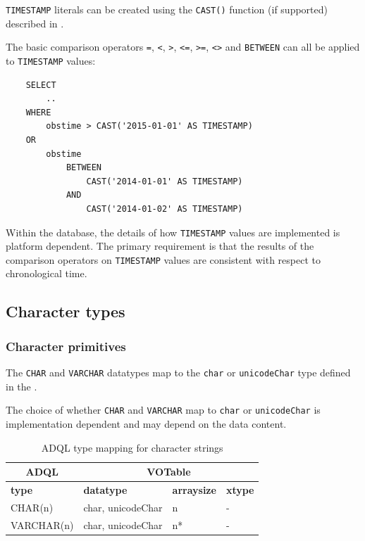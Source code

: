 \documentclass[11pt,a4paper]{ivoa}
\begin{document}
\verb:TIMESTAMP: literals can be created using the \verb:CAST(): function
(if supported) described in .

The basic comparison operators \verb:=:, \verb:<:, \verb:>:, \verb:<=:, \verb:>=:,
\verb:<>: and \verb:BETWEEN: can all be applied to \verb:TIMESTAMP: values:
\begin{verbatim}
    SELECT
        ..
    WHERE
        obstime > CAST('2015-01-01' AS TIMESTAMP)
    OR
        obstime
            BETWEEN
                CAST('2014-01-01' AS TIMESTAMP)
            AND
                CAST('2014-01-02' AS TIMESTAMP)
\end{verbatim}

Within the database, the details of how \verb:TIMESTAMP: values are implemented
is platform dependent. The primary requirement is that the results of the
comparison operators on \verb:TIMESTAMP: values are consistent with respect to
chronological time.

\subsection{Character types}
\label{sec:types.character}

\subsubsection{Character primitives}
\label{sec:types.character.primitive}

The \verb:CHAR: and \verb:VARCHAR: datatypes map to the \verb:char: or
\verb:unicodeChar: type defined in the \VOTableSpec{}.

The choice of whether \verb:CHAR: and \verb:VARCHAR: map to \verb:char: or
\verb:unicodeChar: is implementation dependent and may depend on the data
content.

\begin{table}[th]\footnotesize
    \begin{tabular}
        {|p{}|p{}|p{}|p{}|}
        
        \hline
        \multicolumn{1}{|c|}{\textbf{ADQL}} &
        \multicolumn{3}{|c|}{\textbf{VOTable}}
        \tabularnewline
        
        \hline
        \textbf{type} &
        \textbf{datatype} &
        \textbf{arraysize} &
        \textbf{xtype}
        \tabularnewline

        \hline
        CHAR(n) &
        char, unicodeChar &
        n &
        -
        \tabularnewline

        \hline
        VARCHAR(n) &
        char, unicodeChar &
        n* &
        -
        \tabularnewline
        \hline
    \end{tabular}
    \caption{ADQL type mapping for character strings}
    \label{table:types.character.primitive}
\end{table}
\end{document}
